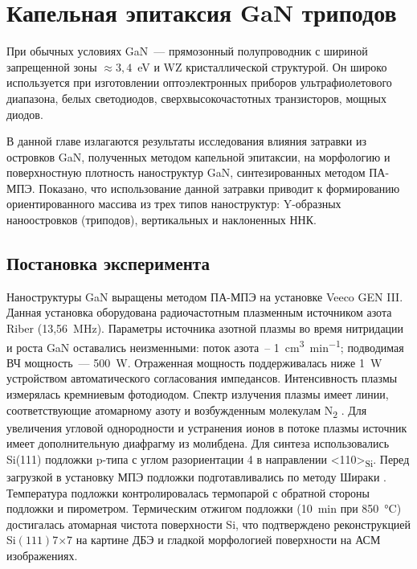 \chapter{Капельная эпитаксия GaN триподов}\label{ch:ch3}

При обычных условиях GaN~--- прямозонный полупроводник с шириной запрещенной
зоны \(\approx 3,4\)~\si{\electronvolt} и WZ кристаллической структурой. Он
широко используется при изготовлении оптоэлектронных приборов ультрафиолетового
диапазона, белых светодиодов, сверхвысокочастотных транзисторов, мощных диодов.

В данной главе излагаются результаты исследования влияния затравки из островков
GaN, полученных методом капельной эпитаксии, на морфологию и поверхностную
плотность наноструктур GaN, синтезированных методом ПА-МПЭ. Показано, что
использование данной затравки \cite{Debnath2009, Yu2014} приводит к
формированию ориентированного массива из трех типов наноструктур: Y-образных
наноостровков (триподов), вертикальных и наклоненных ННК.

\section{Постановка эксперимента}\label{sec:ch3/sec1}

Наноструктуры GaN выращены методом ПА-МПЭ на установке Veeco GEN III. Данная
установка оборудована радиочастотным плазменным источником азота Riber
(13,56~\si{\mega\hertz}). Параметры источника азотной плазмы во время
нитридации и роста GaN оставались неизменными: поток азота~--
1~\si{\centi\meter^3\per\minute}; подводимая ВЧ мощность~--- 500~\si{\watt}.
Отраженная мощность поддерживалась ниже 1~\si{\watt} устройством
автоматического согласования импедансов. Интенсивность плазмы измерялась
кремниевым фотодиодом. Спектр излучения плазмы имеет линии, соответствующие
атомарному азоту и возбужденным молекулам N\textsubscript{2}
\cite{Debnath2016}. Для увеличения угловой однородности и устранения ионов в
потоке плазмы источник имеет дополнительную диафрагму из молибдена. Для синтеза
использовались Si(111) подложки p-типа с углом разориентации 4{\textdegree} в
направлении <110>\textsubscript{Si}. Перед загрузкой в установку МПЭ подложки
подготавливались по методу Шираки \cite{Ishizaka2019}. Температура подложки
контролировалась термопарой с обратной стороны подложки и пирометром.
Термическим отжигом подложки (10~\si{\minute} при 850~\si{\degreeCelsius})
достигалась атомарная чистота поверхности Si, что подтверждено реконструкцией
Si\((111)7\)\(\times\)\(7\) на картине ДБЭ и гладкой морфологией поверхности на
АСМ изображениях.

